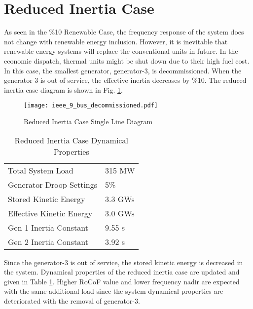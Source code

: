\section{Reduced Inertia Case}
\label{sec:kdecommissioned}
As seen in the \%10 Renewable Case, the frequency response of the system does not change with renewable energy inclusion. However, it is inevitable that renewable energy systems will replace the conventional units in future. In the economic dispatch, thermal units might be shut down due to their high fuel cost. In this case, the smallest generator, generator-3, is decommissioned. When the generator 3 is out of service, the effective inertia decreases by \%10. The reduced inertia case diagram is shown in Fig. \ref{decommissioned_case}.\par
\begin{figure}[h!]
	\centering
	\texttt{[image: ieee\_9\_bus\_decommissioned.pdf]}
	\caption{Reduced Inertia Case Single Line Diagram}
	\label{decommissioned_case}
\end{figure}
\begin{table}[h]
	\centering
	\begin{tabular}{ll}
		\hline
		Total System Load                      & 315 MW    \\
		Generator Droop Settings               & 5\%       \\
		Stored Kinetic Energy 				   & 3.3 GWs \\
		Effective Kinetic Energy 			   & 3.0 GWs \\
		Gen 1 Inertia Constant                 & 9.55 s  \\
		Gen 2 Inertia Constant                 & 3.92 s  \\
		\hline
	\end{tabular}
	\caption{Reduced Inertia Case Dynamical Properties}
	\label{systemdynamicaldatacase3}
\end{table}
Since the generator-3 is out of service, the stored kinetic energy is decreased in the system. Dynamical properties of the reduced inertia case are updated and given in Table \ref{systemdynamicaldatacase3}. Higher RoCoF value and lower frequency nadir are expected with the same additional load since the system dynamical properties are deteriorated with the removal of generator-3.

